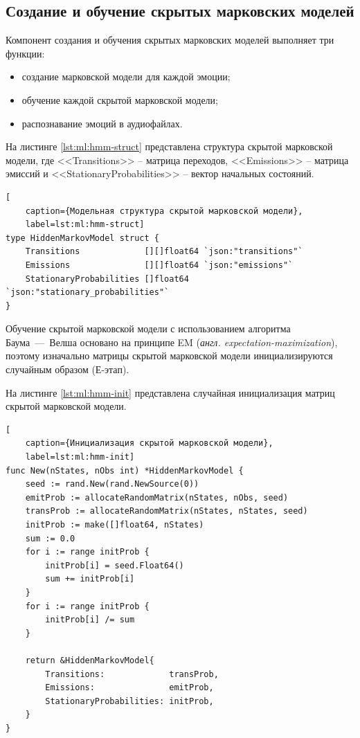 \subsection{Создание и обучение скрытых марковских моделей}
Компонент создания и обучения скрытых марковских моделей выполняет три функции:
\begin{itemize}
	\item создание марковской модели для каждой эмоции;
	\item обучение каждой скрытой марковской модели;
	\item распознавание эмоций в аудиофайлах.
\end{itemize}
На листинге \ref{lst:ml:hmm-struct} представлена структура скрытой марковской модели, где <<Transitions>> -- матрица переходов, <<Emissions>> -- матрица эмиссий и <<StationaryProbabilities>> -- вектор начальных состояний.
\begin{lstlisting}[
	caption={Модельная структура скрытой марковской модели},
	label=lst:ml:hmm-struct]
type HiddenMarkovModel struct {
    Transitions             [][]float64 `json:"transitions"`
    Emissions               [][]float64 `json:"emissions"`
    StationaryProbabilities []float64   `json:"stationary_probabilities"`
}
\end{lstlisting}
Обучение скрытой марковской модели с использованием алгоритма Баума~---~Велша основано на принципе EM (\textit{англ. expectation-maximization}), поэтому изначально матрицы скрытой марковской модели инициализируются случайным образом (Е-этап).

На листинге \ref{lst:ml:hmm-init} представлена случайная инициализация матриц скрытой марковской модели.
\begin{lstlisting}[
	caption={Инициализация скрытой марковской модели},
	label=lst:ml:hmm-init]
func New(nStates, nObs int) *HiddenMarkovModel {
    seed := rand.New(rand.NewSource(0))
    emitProb := allocateRandomMatrix(nStates, nObs, seed)
    transProb := allocateRandomMatrix(nStates, nStates, seed)
    initProb := make([]float64, nStates)
    sum := 0.0
    for i := range initProb {
        initProb[i] = seed.Float64()
        sum += initProb[i]
    }
    for i := range initProb {
        initProb[i] /= sum
    }

    return &HiddenMarkovModel{
        Transitions:             transProb,
        Emissions:               emitProb,
        StationaryProbabilities: initProb,
    }
}
\end{lstlisting}

